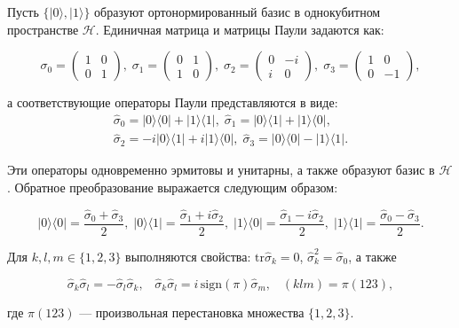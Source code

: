 \documentclass[a4paper]{report}
\begin{document}
Пусть ${\{|0\rangle,|1\rangle\}}$ образуют ортонормированный базис в однокубитном пространстве ${\mathcal{H}}$. Единичная матрица и матрицы Паули задаются как:

$${
    \sigma_0 = \begin{pmatrix}1 & 0 \\ 0 & 1\end{pmatrix},\;
    \sigma_1 = \begin{pmatrix}0 & 1 \\ 1 & 0\end{pmatrix},\;
    \sigma_2 = \begin{pmatrix}0 & -i \\ i & 0\end{pmatrix},\;
    \sigma_3 = \begin{pmatrix}1 & 0 \\ 0 & -1\end{pmatrix},
}$$

\noindent а соответствующие операторы Паули представляются в виде:
\begin{align*}
    \hat{\sigma}_0 = |0\rangle\langle0| + |1\rangle\langle1|,\;
    \hat{\sigma}_1 = |0\rangle\langle1| + |1\rangle\langle0|,     \\
    \hat{\sigma}_2 = -i|0\rangle\langle1| + i|1\rangle\langle0|,\;
    \hat{\sigma}_3 = |0\rangle\langle0| - |1\rangle\langle1|.
\end{align*}

\noindent Эти операторы одновременно эрмитовы и унитарны, а также образуют базис в ${\mathcal{H}}$. Обратное преобразование выражается следующим образом:

$${
    |0\rangle\langle0| = \frac{\hat{\sigma}_0 + \hat{\sigma}_3}{2},\;
    |0\rangle\langle1| = \frac{\hat{\sigma}_1 + i\hat{\sigma}_2}{2},\;
    |1\rangle\langle0| = \frac{\hat{\sigma}_1 - i\hat{\sigma}_2}{2},\;
    |1\rangle\langle1| = \frac{\hat{\sigma}_0 - \hat{\sigma}_3}{2}.
}$$

Для ${k, l, m \in \{1,2,3\}}$ выполняются свойства:
${\mathrm{tr}\hat{\sigma}_k = 0}$,
${\hat{\sigma}^2_k = \hat{\sigma}_0}$, а также

\begin{equation}\label{eq2}
    \hat{\sigma}_k\hat{\sigma}_l = -\hat{\sigma}_l\hat{\sigma}_k, \;\;\;
    \hat{\sigma}_k\hat{\sigma}_l = i\,\mathrm{sign}(\pi)\hat{\sigma}_m, \;\;\;
    (klm) = \pi(123),
\end{equation}

\noindent где ${\pi(123)}$ — произвольная перестановка множества ${\{1,2,3\}}$.
\end{document}
